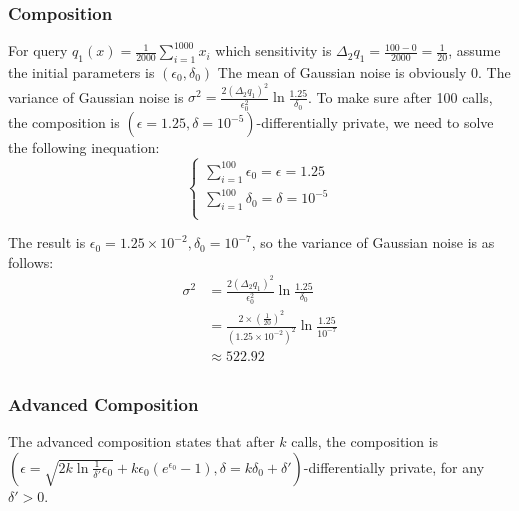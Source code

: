 \documentclass[a4paper,12pt]{article}
\begin{document}
\subsubsection{Composition}
For query $q_1(x) = \frac{1}{2000} \sum_{i = 1}^{1000}x_i$ which sensitivity is
$\Delta_2q_1 = \frac{100 - 0}{2000} = \frac{1}{20}$, assume the initial parameters is $(\epsilon_0, \delta_0)$
The mean of Gaussian noise is obviously $0$.
The variance of Gaussian noise is $\sigma^2 = \frac{2(\Delta_2q_1)^2}{\epsilon_0^2}\ln{\frac{1.25}{\delta_0}}$.
To make sure after 100 calls, the composition is $(\epsilon = 1.25, \delta = 10^{-5})$-differentially private, we need to solve the following inequation:
\begin{equation}
    \begin{cases}
        \sum_{i = 1}^{100} \epsilon_0 = \epsilon = 1.25 \\
        \sum_{i = 1}^{100} \delta_0 = \delta = 10^{-5}  \\
    \end{cases}
\end{equation}

The result is $\epsilon_0 = 1.25 \times 10^{-2}, \delta_0 = 10^{-7}$, so the variance of Gaussian noise is as follows:
\begin{equation}
    \begin{aligned}
        \sigma^2 & = \frac{2(\Delta_2q_1)^2}{\epsilon_0^2}\ln{\frac{1.25}{\delta_0}}                   \\
                 & = \frac{2\times (\frac{1}{20})^2}{(1.25 \times 10^{-2})^2}\ln{\frac{1.25}{10^{-7}}} \\
                 & \approx 522.92                                                                      \\
    \end{aligned}
\end{equation}

\subsubsection{Advanced Composition}
The advanced composition states that after $k$ calls, the composition is $(\epsilon = \sqrt{2k\ln{\frac{1}{\delta'}}\epsilon_0} + k\epsilon_0(e^{\epsilon_0} - 1), \delta = k\delta_0 + \delta')$-differentially private, for any $\delta' > 0$.
\end{document}
